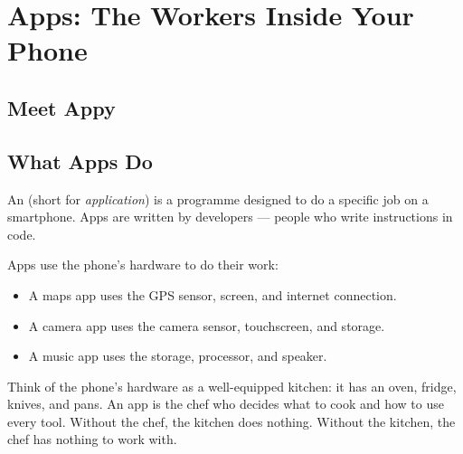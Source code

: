 
\chapter{Apps: The Workers Inside Your Phone}


\section*{Meet Appy}


\sectionrule

\section*{What Apps Do}

An  (short for \emph{application}) is a programme designed to do
a specific job on a smartphone.
Apps are written by developers — people who write instructions in code.

Apps use the phone's hardware to do their work:
\begin{itemize}
  \item A maps app uses the GPS sensor, screen, and internet connection.
  \item A camera app uses the camera sensor, touchscreen, and storage.
  \item A music app uses the storage, processor, and speaker.
\end{itemize}

\begin{picturethis}
  Think of the phone's hardware as a well-equipped kitchen:
  it has an oven, fridge, knives, and pans.
  An app is the chef who decides what to cook and how to use every tool.
  Without the chef, the kitchen does nothing.
  Without the kitchen, the chef has nothing to work with.
\end{picturethis}

